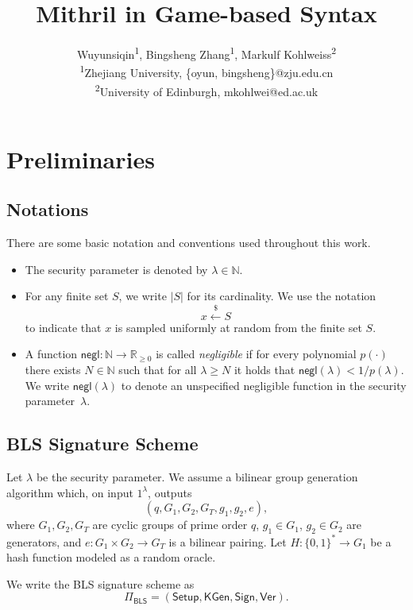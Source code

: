 \documentclass{article}
\title{Mithril in Game-based Syntax}
\author{
     Wuyunsiqin\textsuperscript{1},
    Bingsheng Zhang\textsuperscript{1},  Markulf Kohlweiss\textsuperscript{2}\\
    \textsuperscript{1}Zhejiang University, \{oyun, bingsheng\}@zju.edu.cn \\
    \textsuperscript{2}University of Edinburgh, mkohlwei@ed.ac.uk
}
\begin{document}
\maketitle



\section{Preliminaries}
\subsection{Notations}

There are some basic notation and conventions used throughout this work.

\begin{itemize}
  \item The security parameter is denoted by $\lambda \in \mathbb{N}$.

  \item For any finite set $S$, we write $|S|$ for its cardinality. We use the notation
        \[
          x \xleftarrow{\$} S
        \]
        to indicate that $x$ is sampled uniformly at random from the finite set $S$.

  \item A function $\mathsf{negl} : \mathbb{N} \to \mathbb{R}_{\ge 0}$ is called \emph{negligible} if for every polynomial $p(\cdot)$ there exists $N \in \mathbb{N}$ such that for all $\lambda \ge N$ it holds that $\mathsf{negl}(\lambda) < 1/p(\lambda)$. We write $\mathsf{negl}(\lambda)$ to denote an unspecified negligible function in the security parameter~$\lambda$.
\end{itemize}


\subsection{BLS Signature Scheme}

Let $\lambda$ be the security parameter. We assume a bilinear group
generation algorithm which, on input $1^\lambda$, outputs
\[
  (q, G_1, G_2, G_T, g_1, g_2, e),
\]
where $G_1,G_2,G_T$ are cyclic groups of prime order $q$, $g_1\in G_1$,
$g_2\in G_2$ are generators, and
$e : G_1 \times G_2 \to G_T$ is a bilinear pairing. Let
$H : \{0,1\}^* \to G_1$ be a hash function modeled as a random oracle.

We write the BLS signature scheme as
\[
  \Pi_{\mathsf{BLS}} = (\mathsf{Setup}, \mathsf{KGen}, \mathsf{Sign}, \mathsf{Ver}).
\]
\end{document}
